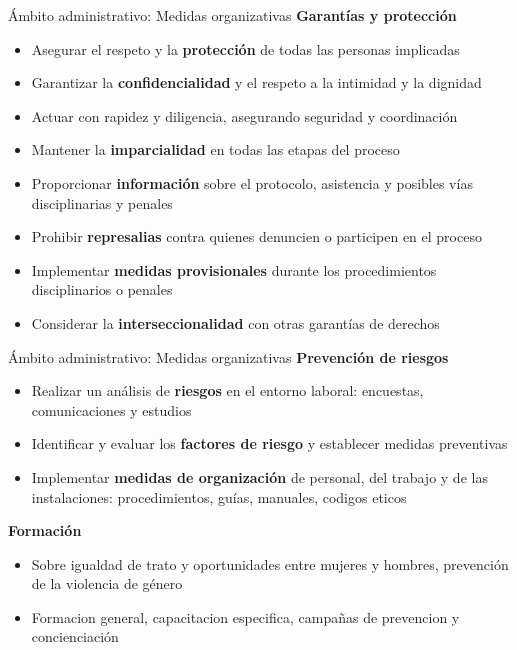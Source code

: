 \documentclass{beamer}
\begin{document}
    \begin{frame}{Ámbito administrativo: Medidas organizativas}
        \textbf{Garantías y protección}
        \begin{itemize}
            \item Asegurar el respeto y la \textbf{protección} de todas las personas implicadas
            \item Garantizar la \textbf{confidencialidad} y el respeto a la intimidad y la dignidad
            \item Actuar con rapidez y diligencia, asegurando seguridad y coordinación
            \item Mantener la \textbf{imparcialidad} en todas las etapas del proceso
            \item Proporcionar \textbf{información} sobre el protocolo, asistencia y posibles vías disciplinarias y penales
            \item Prohibir \textbf{represalias} contra quienes denuncien o participen en el proceso
            \item Implementar \textbf{medidas provisionales} durante los procedimientos disciplinarios o penales
            \item Considerar la \textbf{interseccionalidad} con otras garantías de derechos
        \end{itemize}
    \end{frame}

    \begin{frame}{Ámbito administrativo: Medidas organizativas}
        \textbf{Prevención de riesgos}
        \begin{itemize}
            \item Realizar un análisis de \textbf{riesgos} en el entorno laboral: encuestas, comunicaciones y estudios
            \item Identificar y evaluar los \textbf{factores de riesgo} y establecer medidas preventivas
            \item Implementar \textbf{medidas de organización} de personal, del trabajo y de las instalaciones: procedimientos, guías, manuales, codigos eticos
        \end{itemize}
        \textbf{Formación}
        \begin{itemize}
            \item Sobre igualdad de trato y oportunidades entre mujeres y hombres, prevención de la violencia de género
            \item Formacion general, capacitacion especifica, campañas de prevencion y concienciación
        \end{itemize}
    \end{frame}
\end{document}
